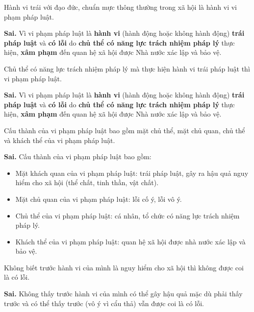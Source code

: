 \begin{ques}
Hành vi trái với đạo đức, chuẩn mực thông thường trong xã hội là hành vi vi phạm pháp luật.
\end{ques}
\begin{ans}
\textbf{Sai.} Vì vi phạm pháp luật là \textbf{hành vi} (hành động hoặc không hành động) \textbf{trái pháp luật} và \textbf{có lỗi} do \textbf{chủ thể có năng lực trách nhiệm pháp lý} thực hiện, \textbf{xâm phạm} đến quan hệ xã hội được Nhà nước xác lập và bảo vệ.
\end{ans}

\begin{ques}
Chủ thể có năng lực trách nhiệm pháp lý mà thực hiện hành vi trái pháp luật thì vi phạm pháp luật.
\end{ques}
\begin{ans}
\textbf{Sai.} Vì vi phạm pháp luật là \textbf{hành vi} (hành động hoặc không hành động) \textbf{trái pháp luật} và \textbf{có lỗi} do \textbf{chủ thể có năng lực trách nhiệm pháp lý} thực hiện, \textbf{xâm phạm} đến quan hệ xã hội được Nhà nước xác lập và bảo vệ.
\end{ans}

\begin{ques}
Cấu thành của vi phạm pháp luật bao gồm mặt chủ thể, mặt chủ quan, chủ thể và khách thể của vi phạm pháp luật.
\end{ques}
\begin{ans}
\textbf{Sai.} Cấu thành của vi phạm pháp luật bao gồm:
\begin{itemize}
\item Mặt khách quan của vi phạm pháp luật: trái pháp luật, gây ra hậu quả nguy hiểm cho xã hội (thể chất, tinh thần, vật chất).
\item Mặt chủ quan của vi phạm pháp luật: lỗi cố ý, lỗi vô ý.
\item Chủ thể của vi phạm pháp luật: cá nhân, tổ chức có năng lực trách nhiệm pháp lý.
\item Khách thể của vi phạm pháp luật: quan hệ xã hội được nhà nước xác lập và bảo vệ.
\end{itemize}
\end{ans}

\begin{ques}
Không biết trước hành vi của mình là nguy hiểm cho xã hội thì không được coi là có lỗi.
\end{ques}
\begin{ans}
\textbf{Sai.} Không thấy trước hành vi của mình có thể gây hậu quả mặc dù phải thấy trước và có thể thấy trước (vô ý vì cẩu thả) vẫn được coi là có lỗi.
\end{ans}

